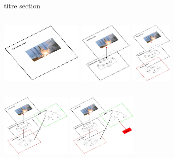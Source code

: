 \begin{frame}{titre section}

\begin{columns}[onlytextwidth,t]
	{
	\includegraphics[height=1.2in,width=\columnwidth,clip=true,trim={-2 0 0 0}]{resources/mc/0001}
	}
	\only<2->
	{
	\includegraphics[height=1.2in,width=\columnwidth,clip=true,trim={0 0 0 0}]{resources/mc/0002}
	}
	\only<3->
	{
	\includegraphics[height=1.2in,width=\columnwidth,clip=true,trim={0 0 0 0}]{resources/mc/0003}
	}
\end{columns}
\begin{columns}[onlytextwidth,t]
	{
		\includegraphics[height=1.2in,width=\columnwidth,clip=true,trim={0 0 0 0}]{resources/mc/0004}
	}
	\only<5->
	{
		\includegraphics[height=1.2in,width=\columnwidth,clip=true,trim={0 0 0 0}]{resources/mc/0005}
}
\end{columns}
\end{frame}
